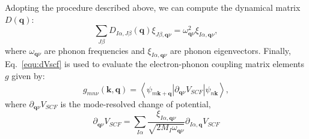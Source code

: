 \documentclass[journal=jctcce,manuscript=article]{achemso}
\newcommand{\bfk}{{\mathbf{k}}}
\newcommand{\bfq}{{\mathbf{q}}}
\begin{document}
Adopting the procedure described above, we can compute the dynamical matrix $D(\bfq)$:
\begin{equation}
    \sum_{J\beta}D_{I\alpha,J\beta}(\bfq) \xi_{J\beta,\bfq\nu} = \omega^2_{\bfq\nu}\xi_{I\alpha,\bfq\nu},
    \label{eq:phonon}
\end{equation}
where $\omega_{\bfq\nu}$ are phonon frequencies and $\xi_{I\alpha,\bfq\nu}$ are phonon eigenvectors. Finally, Eq.~\ref{equ:dVscf} is used to evaluate the electron-phonon coupling matrix elements $g$ given by:\cite{giustino2017electron}
\begin{equation}
    g_{mn\nu}(\bfk,\bfq) = \left\langle \psi_{m\bfk+\bfq} \left| \partial_{\bfq\nu}V_{SCF} \right| \psi_{n\bfk} \right\rangle,
    \label{eq:g}
\end{equation}
where $\partial_{\bfq\nu}V_{SCF}$ is the mode-resolved change of potential,
\begin{equation}
\partial_{\bfq\nu}V_{SCF} = \sum_{I\alpha}\frac{\xi_{I\alpha,\bfq\nu}}{\sqrt{2M_I\omega_{\bfq\nu}}}\partial_{I\alpha,\bfq}V_{SCF}
\end{equation}
\end{document}
